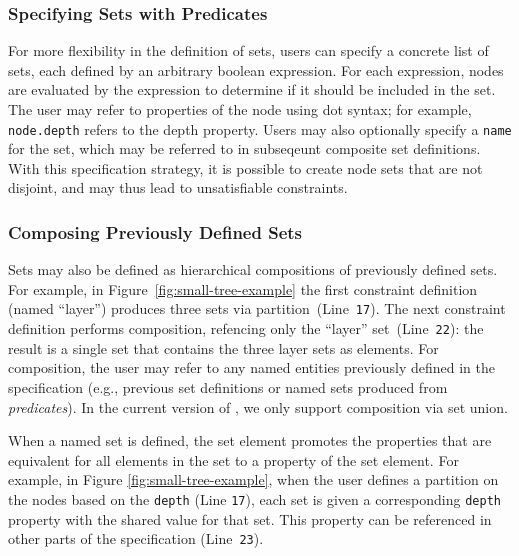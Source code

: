 \subsubsection{Specifying Sets with Predicates}

For more flexibility in the definition of sets, users
can specify a concrete list of sets, each defined by an arbitrary boolean
expression. For each expression, nodes are evaluated by the expression
to determine if it should be included in the set. The user may
refer to properties of the node using dot syntax; for example,
\texttt{node.depth} refers to the depth property. Users may also optionally 
specify a \texttt{name} for the set, which may be referred to in subseqeunt
composite set definitions. With this specification strategy, it is possible
to create node sets that are not disjoint, and may thus lead to
unsatisfiable constraints.



\subsubsection{Composing Previously Defined Sets}

Sets may also be defined as hierarchical
compositions of previously defined sets. For example, in
Figure~\ref{fig:small-tree-example} the first constraint definition
(named ``layer'') produces three sets via
partition~(Line~\texttt{17}). The next constraint definition performs 
composition, refencing only the ``layer'' set~(Line~\texttt{22}): the result
is a single set that contains the three layer sets as elements.
For composition, the user may
refer to any named entities previously defined in the specification (e.g.,
previous set definitions or named sets produced from \emph{predicates}).
In the current version of \projectname, we only support composition via
set union.

When a named set is defined, the set element promotes the properties that
are equivalent for all elements in the set to a property of the set
element. For example, in Figure \ref{fig:small-tree-example}, when the user
defines a partition on the nodes based on the \texttt{depth} (Line
\texttt{17}), each set is given a corresponding \texttt{depth} property with
the shared value for that set. This property can be referenced in other 
parts of the \projectname specification (Line~\texttt{23}).

